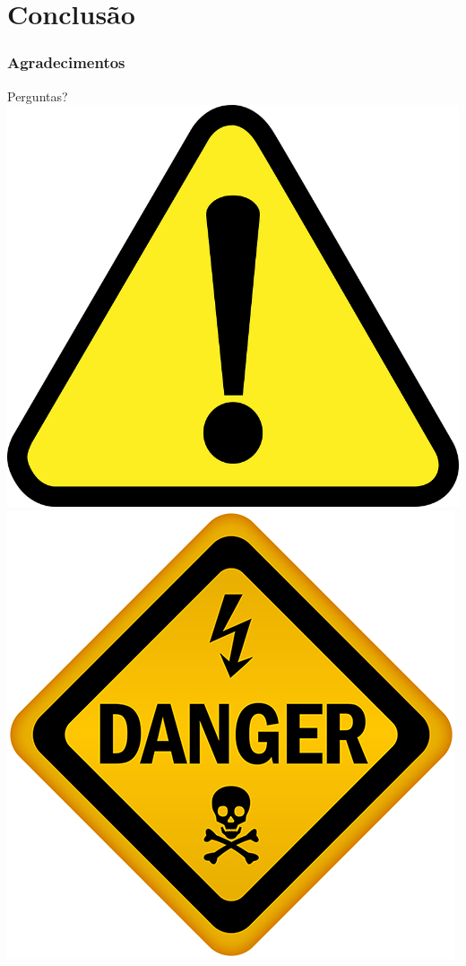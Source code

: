 \documentclass[12pt]{beamer}
\begin{document}
\section{Conclusão}
\begin{frame}
    \frametitle{Agradecimentos}
    \centering
    \Huge{Perguntas?}
    \includegraphics[width=\textwidth]{alerta.png}
    \includegraphics[width=\textwidth]{perigo.png}

\end{frame}
\end{document}
